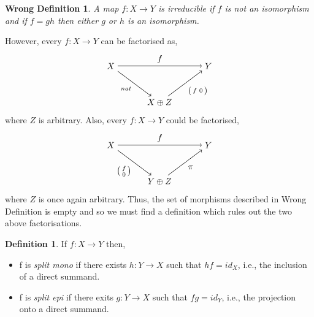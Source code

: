 \documentclass[11.5pt, twoside, a4paper, titlepage]{report}
\theoremstyle{definition}
\newtheorem{mydef}{Definition}[section]
\theoremstyle{plain}
\newtheorem*{wrong}{Wrong Definition}
\begin{document}
\begin{wrong}
A map $f: X \to Y$ is \emph{irreducible} if $f$ is not an isomorphism and if $f=gh$ then either $g$ or $h$ is an isomorphism.
\end{wrong}

\noindent
However, every $f:X \to Y$ can be factorised as,
\begin{equation*}
\begin{tikzpicture}[->,-latex, auto, main path/.style={->, semithick}, main node/.style={}]
\node	[main node]		(1) at (0,0)		{$X$};
\node [main node]		(2) at (4,0)		{$Y$};
\node [main node]		(3) at (2,-1.5)	{$X\oplus Z$};

\draw (1) [main path] edge node [auto] {$f$} (2);
\draw (1) [main path] edge node [auto, swap] {$\scriptstyle{nat}$} (3);
\draw (3) [main path] edge node [auto, swap] {$\left(\begin{smallmatrix}f & 0 \end{smallmatrix}\right)$} (2);
\end{tikzpicture}
\end{equation*}
where $Z$ is arbitrary. Also, every $f: X \to Y$ could be factorised, 
\begin{equation*}
\begin{tikzpicture}[->,-latex, auto, main path/.style={->, semithick}, main node/.style={}]
\node	[main node]		(1) at (0,0)		{$X$};
\node [main node]		(2) at (4,0)		{$Y$};
\node [main node]		(3) at (2,-1.5)	{$Y\oplus Z$};

\draw (1) [main path] edge node [auto] {$f$} (2);
\draw (1) [main path] edge node [auto, swap] {$\left(\begin{smallmatrix}f \\ 0 \end{smallmatrix}\right)$} (3);
\draw (3) [main path] edge node [auto, swap] {$\pi$} (2);
\end{tikzpicture}
\end{equation*}
where $Z$ is once again arbitrary.
Thus, the set of morphisms described in Wrong Definition is empty and so we must find a definition which rules out the two above factorisations.

\begin{mydef}
If $f: X \to Y$ then,
\begin{itemize}
\item f is \emph{split mono} if there exists $h: Y \to X$ such that $hf=id_X$, i.e., the inclusion of a direct summand.
\item f is \emph{split epi} if there exits $g: Y \to X$ such that $fg=id_Y$, i.e., the projection onto a direct summand.
\end{itemize}
\end{mydef}
\end{document}

